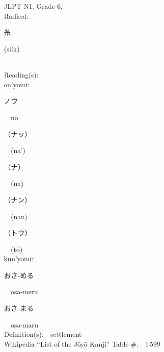 \begin{multicols}{2}
\ \ \\
{\fontsize{34pt}{40pt}  }\ \ \\  %
{JLPT N1, Grade 6, \\Radical:\ \ {\begin{CJK}{UTF8}{min} 糸 \end{CJK}} (silk) } \\
Reading(s):\ \ \\
{\hspace*{1em}}on'yomi:\ \ \\
{\hspace*{2em}}{\begin{CJK}{UTF8}{min} ノウ \end{CJK}}\ \ n\=o\ \ \\
{\hspace*{2em}}{\begin{CJK}{UTF8}{min} （ナッ） \end{CJK}}\ \ (na')\ \ \\
{\hspace*{2em}}{\begin{CJK}{UTF8}{min} （ナ） \end{CJK}}\ \ (na)\ \ \\
{\hspace*{2em}}{\begin{CJK}{UTF8}{min} （ナン） \end{CJK}}\ \ (nan)\ \ \\
{\hspace*{2em}}{\begin{CJK}{UTF8}{min} （トウ） \end{CJK}}\ \ (t\=o)\ \ \\
{\hspace*{1em}}kun'yomi:\ \ \\
{\hspace*{2em}}{\begin{CJK}{UTF8}{min} おさ-める \end{CJK}}\ \ osa-meru\ \ \\
{\hspace*{2em}}{\begin{CJK}{UTF8}{min} おさ-まる \end{CJK}}\ \ osa-maru\ \ \\
Definition(s):\ \ settlement \\
Wikipedia ``List of the J\=oy\=o Kanji'' Table \#:\ \ 1\,599 \\

\end{multicols}
